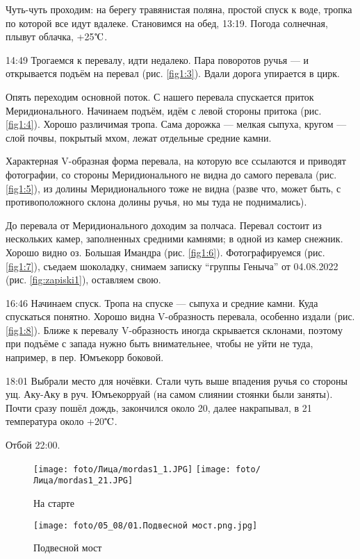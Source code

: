 Чуть-чуть проходим: на берегу травянистая поляна, простой спуск к воде, тропка по которой все идут вдалеке.
Становимся на обед, 13:19. Погода солнечная, плывут облачка, +25$\tccentigrade$.

14:49 Трогаемся к перевалу, идти недалеко. Пара поворотов ручья --- и открывается подъём на перевал (рис. \ref{fig1:3}).
Вдали дорога упирается в цирк.

Опять переходим основной поток. С нашего перевала спускается приток Меридионального. Начинаем подъём,
идём с левой стороны притока (рис. \ref{fig1:4}). Хорошо различимая тропа. Сама дорожка --- мелкая сыпуха, кругом --- слой почвы,
покрытый мхом, лежат отдельные средние камни.

Характерная V-образная форма перевала, на которую все ссылаются и приводят фотографии, со стороны Меридионального
не видна до самого перевала (рис. \ref{fig1:5}), из долины Меридионального тоже не видна
(разве что, может быть, с противоположного склона долины ручья, но мы туда не поднимались).

До перевала от Меридионального доходим за полчаса. Перевал состоит из нескольких камер, заполненных средними камнями;
в одной из камер снежник. Хорошо видно оз. Большая Имандра (рис. \ref{fig1:6}).
Фотографируемся (рис. \ref{fig1:7}), съедаем шоколадку,
снимаем записку \enquote{группы Геныча} от 04.08.2022 (рис. \ref{fig:zapiski1}), оставляем свою.

16:46 Начинаем спуск. Тропа на спуске --- сыпуха и средние камни. Куда спускаться понятно.
Хорошо видна V-образность перевала, особенно издали (рис. \ref{fig1:8}). Ближе к перевалу V-образность иногда скрывается склонами,
поэтому при подъёме с запада нужно быть внимательнее, чтобы не уйти не туда, например, в пер. Юмъекорр боковой.

18:01 Выбрали место для ночёвки. Стали чуть выше впадения ручья со стороны ущ. Аку-Аку в руч. Юмъекорруай
(на самом слиянии стоянки были заняты). Почти сразу пошёл дождь, закончился около 20, далее накрапывал,
в 21 температура около +20$\tccentigrade$.

Отбой 22:00.

\begin{figure}
    \centering
    \texttt{[image: foto/Лица/mordas1\_1.JPG]}
    \texttt{[image: foto/Лица/mordas1\_21.JPG]}
    \caption{На старте}
    \label{fig1:1}
\end{figure}

\begin{figure}
    \centering
    \texttt{[image: foto/05\_08/01.Подвесной мост.png.jpg]}
    \caption{Подвесной мост}
    \label{fig1:2}
\end{figure}

